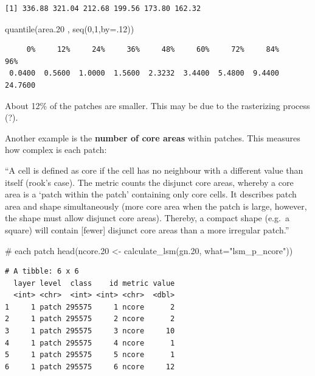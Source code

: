 \documentclass[
  letterpaper,
  DIV=11,
  numbers=noendperiod]{scrartcl}
\newenvironment{Shaded}{\begin{snugshade}}{\end{snugshade}}
\newcommand{\AttributeTok}[1]{\textcolor[rgb]{0.40,0.45,0.13}{#1}}
\newcommand{\CommentTok}[1]{\textcolor[rgb]{0.37,0.37,0.37}{#1}}
\newcommand{\DecValTok}[1]{\textcolor[rgb]{0.68,0.00,0.00}{#1}}
\newcommand{\FloatTok}[1]{\textcolor[rgb]{0.68,0.00,0.00}{#1}}
\newcommand{\FunctionTok}[1]{\textcolor[rgb]{0.28,0.35,0.67}{#1}}
\newcommand{\NormalTok}[1]{\textcolor[rgb]{0.00,0.23,0.31}{#1}}
\newcommand{\OtherTok}[1]{\textcolor[rgb]{0.00,0.23,0.31}{#1}}
\newcommand{\StringTok}[1]{\textcolor[rgb]{0.13,0.47,0.30}{#1}}
\begin{document}
\begin{verbatim}
[1] 336.88 321.04 212.68 199.56 173.80 162.32
\end{verbatim}

\begin{Shaded}
\begin{Highlighting}[]
\FunctionTok{quantile}\NormalTok{(area}\FloatTok{.20}\NormalTok{ , }\FunctionTok{seq}\NormalTok{(}\DecValTok{0}\NormalTok{,}\DecValTok{1}\NormalTok{,}\AttributeTok{by=}\NormalTok{.}\DecValTok{12}\NormalTok{))}
\end{Highlighting}
\end{Shaded}

\begin{verbatim}
     0%     12%     24%     36%     48%     60%     72%     84%     96% 
 0.0400  0.5600  1.0000  1.5600  2.3232  3.4400  5.4800  9.4400 24.7600 
\end{verbatim}

About 12\% of the patches are smaller. This may be due to the
rasterizing process (?).

Another example is the \textbf{number of core areas} within patches.
This measures how complex is each patch:

``A cell is defined as core if the cell has no neighbour with a
different value than itself (rook's case). The metric counts the
disjunct core areas, whereby a core area is a `patch within the patch'
containing only core cells. It describes patch area and shape
simultaneously (more core area when the patch is large, however, the
shape must allow disjunct core areas). Thereby, a compact shape (e.g.~a
square) will contain {[}fewer{]} disjunct core areas than a more
irregular patch.''

\begin{Shaded}
\begin{Highlighting}[]
\CommentTok{\# each patch}
\FunctionTok{head}\NormalTok{(ncore}\FloatTok{.20} \OtherTok{\textless{}{-}} \FunctionTok{calculate\_lsm}\NormalTok{(gn}\FloatTok{.20}\NormalTok{, }\AttributeTok{what=}\StringTok{"lsm\_p\_ncore"}\NormalTok{))}
\end{Highlighting}
\end{Shaded}

\begin{verbatim}
# A tibble: 6 x 6
  layer level  class    id metric value
  <int> <chr>  <int> <int> <chr>  <dbl>
1     1 patch 295575     1 ncore      2
2     1 patch 295575     2 ncore      2
3     1 patch 295575     3 ncore     10
4     1 patch 295575     4 ncore      1
5     1 patch 295575     5 ncore      1
6     1 patch 295575     6 ncore     12
\end{verbatim}
\end{document}
